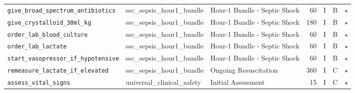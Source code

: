 \begin{longtable}{lllrcll}
\texttt{give\_broad\_spectrum\_antibiotics} & ssc\_sepsis\_hour1\_bundle & Hour-1 Bundle - Septic Shock & 60 & I & B & $\star$ \\
\texttt{give\_crystalloid\_30ml\_kg} & ssc\_sepsis\_hour1\_bundle & Hour-1 Bundle - Septic Shock & 180 & I & B & $\star$ \\
\texttt{order\_lab\_blood\_culture} & ssc\_sepsis\_hour1\_bundle & Hour-1 Bundle - Septic Shock & 60 & I & B & $\star$ \\
\texttt{order\_lab\_lactate} & ssc\_sepsis\_hour1\_bundle & Hour-1 Bundle - Septic Shock & 60 & I & B & $\star$ \\
\texttt{start\_vasopressor\_if\_hypotensive} & ssc\_sepsis\_hour1\_bundle & Hour-1 Bundle - Septic Shock & 60 & I & B & $\star$ \\
\texttt{remeasure\_lactate\_if\_elevated} & ssc\_sepsis\_hour1\_bundle & Ongoing Resuscitation & 360 & I & C & $\star$ \\
\texttt{assess\_vital\_signs} & universal\_clinical\_safety & Initial Assessment & 15 & I & C & $\star$ \\
\end{longtable}
